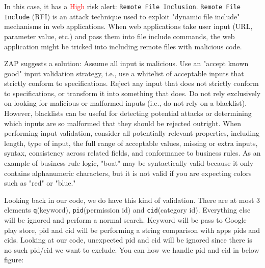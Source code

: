 \documentclass[12pt, a4paper]{article}
\newcommand{\code}[1]{\texttt{#1}}
\begin{document}
In this case, it has a \textcolor{red}{High} risk alert: \code{Remote File Inclusion}. \code{Remote File Include} (RFI) is an attack technique used to exploit "dynamic file include" mechanisms in web applications. When web applications take user input (URL, parameter value, etc.) and pass them into file include commands, the web application might be tricked into including remote files with malicious code.

ZAP suggests a solution: 
Assume all input is malicious. Use an "accept known good" input validation strategy, i.e., use a whitelist of acceptable inputs that strictly conform to specifications. Reject any input that does not strictly conform to specifications, or transform it into something that does. Do not rely exclusively on looking for malicious or malformed inputs (i.e., do not rely on a blacklist). However, blacklists can be useful for detecting potential attacks or determining which inputs are so malformed that they should be rejected outright.
When performing input validation, consider all potentially relevant properties, including length, type of input, the full range of acceptable values, missing or extra inputs, syntax, consistency across related fields, and conformance to business rules. As an example of business rule logic, "boat" may be syntactically valid because it only contains alphanumeric characters, but it is not valid if you are expecting colors such as "red" or "blue."

Looking back in our code, we do have this kind of validation. There are at most 3 elements \code{q}(keyword), \code{pid}(permission id) and \code{cid}(category id). Everything else will be ignored and perform a normal search. Keyword will be pass to Google play store, pid and cid will be performing a string comparison with apps pids and cids. Looking at our code, unexpected pid and cid will be ignored since there is no such pid/cid we want to exclude. You can how we handle pid and cid in below figure:
\end{document}
